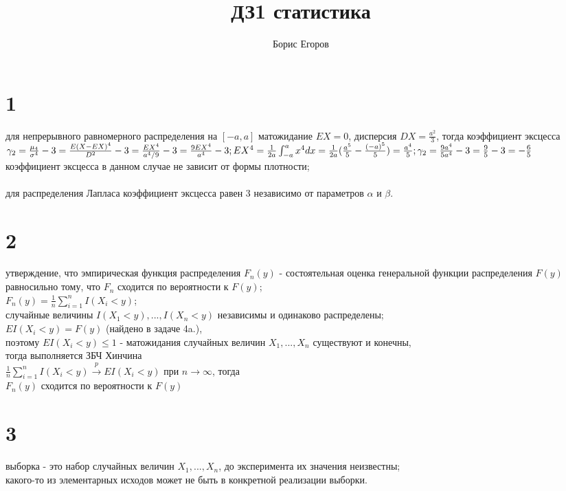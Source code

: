 \documentclass{article}
\author{Борис Егоров}
\title{ДЗ1 статистика}
\begin{document}
	\maketitle
	\begin{large}
	\section*{1}
	для непрерывного равномерного распределения на $[-a,a]$ матожидание $EX=0$, дисперсия $DX=\frac{a^2}{3}$, тогда коэффициент эксцесса\\
	$
	\gamma_2=\frac{\mu_4}{\sigma^4}-3=\\
	\frac{E(X-EX)^4}{D^2}-3=\\
	\frac{EX^4}{a^4/9}-3=\\
	\frac{9EX^4}{a^4}-3;\\
	EX^4=\frac{1}{2a}\int_{-a}^{a}x^4dx=\\
	\frac{1}{2a}(\frac{a^5}{5}-\frac{(-a)^5}{5})=\\
	\frac{a^4}{5};\\
	\gamma_2=\frac{9a^4}{5a^4}-3=\frac{9}{5}-3=-\frac{6}{5}
	$\\
	коэффициент эксцесса в данном случае не зависит от формы плотности;\\\\
	для распределения Лапласа коэффициент эксцесса равен 3 независимо от параметров $\alpha$ и $\beta$.
	\section*{2}
	утверждение, что эмпирическая функция распределения $F_n(y)$ - состоятельная оценка генеральной функции распределения $F(y)$ равносильно тому, что $F_n$ сходится по вероятности к $F(y)$;\\
	$F_n(y)=\frac{1}{n}\sum_{i=1}^{n}I(X_i<y)$;\\
	случайные величины $I(X_1<y),...,I(X_n<y)$ независимы и одинаково распределены;\\
	$EI(X_i<y)=F(y)$ (найдено в задаче 4a.),\\
	поэтому $EI(X_i<y)\le1$ - матожидания случайных величин $X_1,...,X_n$ существуют и конечны,\\
	тогда выполняется ЗБЧ Хинчина\\
	$\frac{1}{n}\sum_{i=1}^{n}I(X_i<y) \overset{p}{\to} EI(X_i<y)$ при $n\rightarrow\infty$, тогда\\
	$F_n(y)$ сходится по вероятности к $F(y)$
	\section*{3}
	выборка - это набор случайных величин $X_1,...,X_n$, до эксперимента их значения неизвестны;\\
	какого-то из элементарных исходов может не быть в конкретной реализации выборки.

\end{large}
\end{document}

